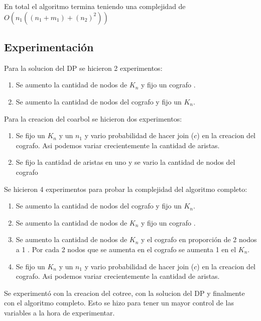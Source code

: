 En total el algoritmo termina teniendo una complejidad de $O(n_1((n_1 + m_1) + (n_2)^2 ))$

\subsection{Experimentación}

    

    Para la solucion del DP se hicieron 2 experimentos:

    \begin{enumerate}
        \item Se aumento la cantidad de nodos de $K_n$ y fijo un cografo .
        \item Se aumento la cantidad de nodos del cografo y fijo un $K_n$. 
    \end{enumerate}

    Para la creacion del coarbol se hicieron dos experimentos:

    \begin{enumerate}
    
        \item Se fijo un $K_n$ y un $n_1$ y vario probabilidad de hacer join ($c$) en la creacion del cografo. Asi podemos variar crecientemente la cantidad de aristas.
        \item Se fijo la cantidad de aristas en uno y se vario la cantidad de nodos del cografo

    \end{enumerate}


    Se hicieron 4 experimentos para probar la complejidad del algoritmo completo:

    \begin{enumerate}
    \item Se aumento la cantidad de nodos del cografo y fijo un $K_n$. 
    \item Se aumento la cantidad de nodos de $K_n$ y fijo un cografo .
    \item Se aumento la cantidad de nodos de $K_n$ y el cografo en proporción de 2 nodos a 1 . Por cada 2 nodos que se aumenta en el cografo se aumenta 1 en el $K_n$.
    \item Se fijo un $K_n$ y un $n_1$ y vario probabilidad de hacer join ($c$) en la creacion del cografo. Asi podemos variar crecientemente la cantidad de aristas.
    \end{enumerate}

    Se experimentó con la creacion del cotree, con la solucion del DP y finalmente con el algoritmo completo.
    Esto se hizo para tener un mayor control de las variables a la hora de experimentar.




